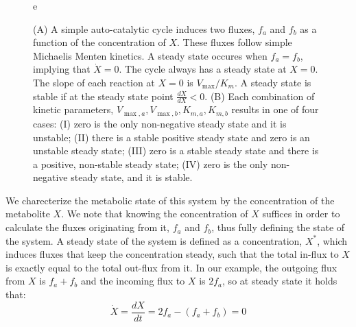\documentclass[a4page,notitlepage]{article}
\begin{document}
\begin{figure}[h!]
\begin{minipage}[c]{.65\linewidth}
{}
       \end{minipage}
      e\caption{\label{fig:simplecycle}
        (A) A simple auto-catalytic cycle induces two fluxes, $f_a$ and $f_b$ as a function of the concentration of $X$.
        These fluxes follow simple Michaelis Menten kinetics.
        A steady state occures when $f_a=f_b$, implying that $\dot{X}=0$.
        The cycle always has a steady state at $X=0$.
        The slope of each reaction at $X=0$ is $V_{\max}/K_m$.
        A steady state is stable if at the steady state point $\frac{d\dot{X}}{dX}<0$.
        (B) Each combination of kinetic parameters, $V_{\max,a},V_{\max,b},K_{m,a},K_{m,b}$ results in one of four cases: 
       (I) zero is the only non-negative steady state and it is unstable; 
       (II) there is a stable positive steady state and zero is an unstable steady state; 
       (III) zero is a stable steady state and there is a positive, non-stable steady state; 
       (IV) zero is the only non-negative steady state, and it is stable.}
    \end{figure}

    We charecterize the metabolic state of this system by the concentration of the metabolite $X$.
    We note that knowing the concentration of $X$ suffices in order to calculate the fluxes originating from it, $f_a$ and $f_b$, thus fully defining the state of the system.
    A steady state of the system is defined as a concentration, $X^*$, which induces fluxes that keep the concentration steady, such that the total in-flux to $X$ is exactly equal to the total out-flux from it.
    In our example, the outgoing flux from $X$ is $f_a+f_b$ and the incoming flux to $X$ is $2f_a$, so at steady state it holds that:
    \begin{equation*}
      \dot X = \frac{dX}{dt} = 2f_a - (f_a + f_b) = 0
    \end{equation*}
\end{document}
